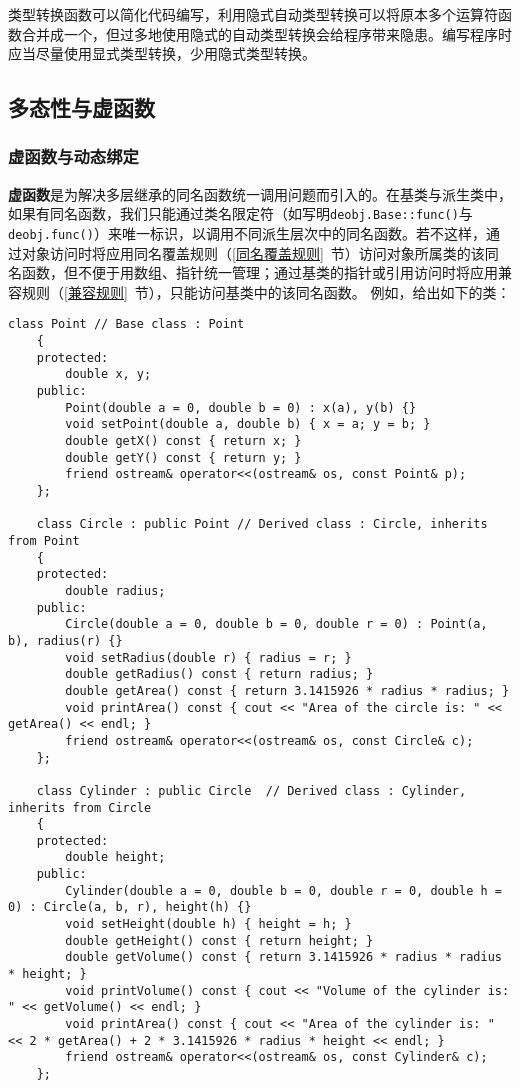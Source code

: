 \documentclass[10pt, a4paper, oneside, fontset=none]{ctexart}
\theoremstyle{plain}
\theoremstyle{definition}
\newcommand{\colors}[1]{\color{#1!75!black}}
\newcommand{\tboba}[1]{\textbf{\kai\color{bali!75!black}#1}}
\begin{document}
类型转换函数可以简化代码编写，利用隐式自动类型转换可以将原本多个运算符函数合并成一个，但过多地使用隐式的自动类型转换会给程序带来隐患。编写程序时应当尽量使用显式类型转换，少用隐式类型转换。

\subsection{多态性与虚函数}

\subsubsection{虚函数与动态绑定}

\tboba{虚函数}是为解决多层继承的同名函数统一调用问题而引入的。在基类与派生类中，如果有同名函数，我们只能通过类名限定符（如写明\texttt{deobj.Base::func()}与\texttt{deobj.func()}）来唯一标识，以调用不同派生层次中的同名函数。若不这样，通过对象访问时将应用同名覆盖规则（\ref{同名覆盖规则}~节）访问对象所属类的该同名函数，但不便于用数组、指针统一管理；通过基类的指针或引用访问时将应用兼容规则（\ref{兼容规则}~节），只能访问基类中的该同名函数。
例如，给出如下的类：
\begin{lstlisting}[moreemph={Point, Circle, Cylinder}, emphstyle=\colors{qinglv}, moreemph={[2]{x, y, a, b, os, p, radius, r, c, height, h}}, emphstyle={[2]\it\ttfamily},]
	class Point // Base class : Point
	{
	protected:
		double x, y;
	public:
		Point(double a = 0, double b = 0) : x(a), y(b) {}
		void setPoint(double a, double b) { x = a; y = b; }
		double getX() const { return x; }
		double getY() const { return y; }
		friend ostream& operator<<(ostream& os, const Point& p);
	};
	
	class Circle : public Point // Derived class : Circle, inherits from Point
	{
	protected:
		double radius;
	public:
		Circle(double a = 0, double b = 0, double r = 0) : Point(a, b), radius(r) {}
		void setRadius(double r) { radius = r; }
		double getRadius() const { return radius; }
		double getArea() const { return 3.1415926 * radius * radius; }
		void printArea() const { cout << "Area of the circle is: " << getArea() << endl; }
		friend ostream& operator<<(ostream& os, const Circle& c);
	};
		
	class Cylinder : public Circle  // Derived class : Cylinder, inherits from Circle
	{
	protected:
		double height;
	public:
		Cylinder(double a = 0, double b = 0, double r = 0, double h = 0) : Circle(a, b, r), height(h) {}
		void setHeight(double h) { height = h; }
		double getHeight() const { return height; }
		double getVolume() const { return 3.1415926 * radius * radius * height; }
		void printVolume() const { cout << "Volume of the cylinder is: " << getVolume() << endl; }
		void printArea() const { cout << "Area of the cylinder is: " << 2 * getArea() + 2 * 3.1415926 * radius * height << endl; }
		friend ostream& operator<<(ostream& os, const Cylinder& c);
	};
\end{lstlisting}
\end{document}
